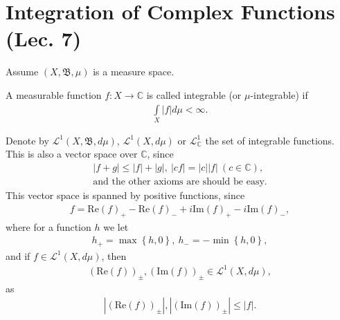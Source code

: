 \section{Integration of Complex Functions (Lec. 7)}
Assume \((X, \mathfrak{B}, \mu)\) is a measure space.
\begin{definition}
    A measurable function \(f:X\rightarrow \mathbb{C}\) is called integrable (or $\mu$-integrable) if
    \begin{align*}
        \int\limits_{X}|f|d\mu < \infty.
    \end{align*}
\end{definition}
Denote by \(\mathcal{L}^1(X, \mathfrak{B}, d\mu)\), \(\mathcal{L}^1(X, d\mu)\) or \(\mathcal{L}_{\mathbb{C}}^{1}\) the set of integrable
functions. This is also a vector space over $\mathbb{C}$, since
\begin{align*}
    |f + g| \leq |f| + |g|, \ |cf| = |c||f| \ (c\in \mathbb{C}), \\
    \text{and the other axioms are should be easy}.
\end{align*}
This vector space is spanned by positive functions, since
\begin{align*}
    f = \text{Re}(f)_{+} - \text{Re}(f)_{-} + i\text{Im}(f)_{+} - i\text{Im}(f)_{-},
\end{align*}
where for a function $h$ we let
\begin{align*}
    h_{+} = \max\left\{h,0\right\}, \ h_{-} = -\min\left\{ h,0 \right\},
\end{align*}
and if \(f\in \mathcal{L}^{1}(X, d\mu)\), then
\begin{align*}
    (\text{Re}(f))_{\pm}, (\text{Im}(f))_{\pm} \in \mathcal{L}^{1}(X, d\mu),
\end{align*}
as
\begin{align*}
    |(\text{Re}(f))_{\pm}|, |(\text{Im}(f))_{\pm}| \leq |f|.
\end{align*}

